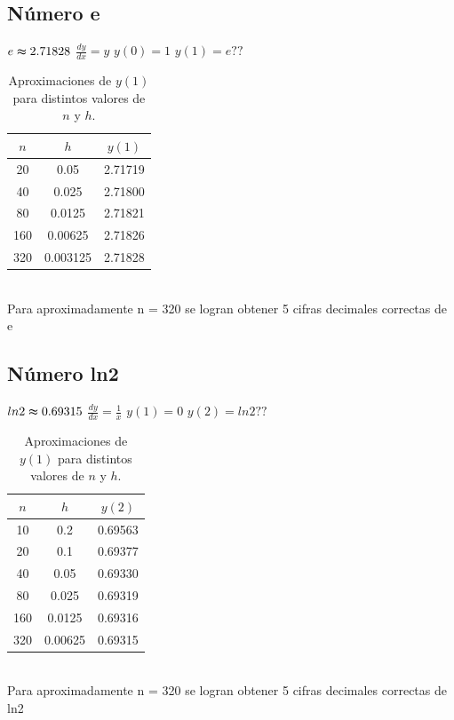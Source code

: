 \documentclass[12pt,a4paper]{article}
\begin{document}
        \subsection{Número e}
        \vspace*{1cm}
        $ e \thickapprox 2.71828$ \hspace*{1cm}
        $\frac{dy}{d x} = y$\hspace*{1cm}
        $y(0) = 1$\hspace*{1cm}
        $y(1) = e ??$\\
        \begin{table}[ht]
            \centering
            \begin{tabular}{ccc}
            \toprule
            $n$ & $h$ & $y(1)$ \\
            \midrule
            20   & 0.05    & 2.71719 \\
            40   & 0.025   & 2.71800 \\
            80   & 0.0125  & 2.71821 \\
            160  & 0.00625 & 2.71826 \\
            320  & 0.003125& 2.71828 \\
            \bottomrule
            \end{tabular}
            \caption{Aproximaciones de $y(1)$ para distintos valores de $n$ y $h$.}
            \label{tab:aproximaciones}
            \end{table}\\
        Para aproximadamente n = 320 se logran obtener 5 cifras decimales correctas de e
        \subsection{Número ln2}
        \vspace{1cm}
        $ln2 \thickapprox 0.69315$\hspace*{1cm}
        $\frac{dy}{d x} = \frac{1}{x}$\hspace*{1cm}
        $y(1) = 0$\hspace*{1cm}
        $y(2) = ln2 ??$\\
        \begin{table}[ht]
            \centering
            \begin{tabular}{ccc}
            \toprule
            \(n\) & \(h\) & \(y(2)\) \\
            \midrule
            10   & 0.2    & 0.69563 \\
            20   & 0.1    & 0.69377 \\
            40   & 0.05   & 0.69330 \\
            80   & 0.025  & 0.69319 \\
            160  & 0.0125 & 0.69316 \\
            320  & 0.00625& 0.69315 \\
            \bottomrule
            \end{tabular}
            \caption{Aproximaciones de \(y(1)\) para distintos valores de \(n\) y \(h\).}
            \label{tab:aproximaciones_y1}
            \end{table}\\
            Para aproximadamente n = 320 se logran obtener 5 cifras decimales correctas de ln2
\end{document}
